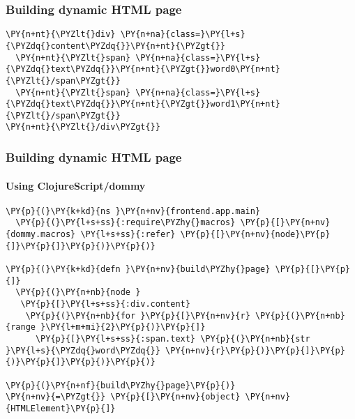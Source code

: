 \begin{frame}[fragile]
  \frametitle{Building dynamic HTML page}
\begin{Verbatim}[commandchars=\\\{\}]
\PY{n+nt}{\PYZlt{}div} \PY{n+na}{class=}\PY{l+s}{\PYZdq{}content\PYZdq{}}\PY{n+nt}{\PYZgt{}}
  \PY{n+nt}{\PYZlt{}span} \PY{n+na}{class=}\PY{l+s}{\PYZdq{}text\PYZdq{}}\PY{n+nt}{\PYZgt{}}word0\PY{n+nt}{\PYZlt{}/span\PYZgt{}}
  \PY{n+nt}{\PYZlt{}span} \PY{n+na}{class=}\PY{l+s}{\PYZdq{}text\PYZdq{}}\PY{n+nt}{\PYZgt{}}word1\PY{n+nt}{\PYZlt{}/span\PYZgt{}}
\PY{n+nt}{\PYZlt{}/div\PYZgt{}}
\end{Verbatim}
\end{frame}


\begin{frame}[fragile]
  \frametitle{Building dynamic HTML page}
  \framesubtitle{Using ClojureScript/dommy}
\begin{Verbatim}[commandchars=\\\{\}]
\PY{p}{(}\PY{k+kd}{ns }\PY{n+nv}{frontend.app.main}
  \PY{p}{(}\PY{l+s+ss}{:require\PYZhy{}macros} \PY{p}{[}\PY{n+nv}{dommy.macros} \PY{l+s+ss}{:refer} \PY{p}{[}\PY{n+nv}{node}\PY{p}{]}\PY{p}{]}\PY{p}{)}\PY{p}{)}

\PY{p}{(}\PY{k+kd}{defn }\PY{n+nv}{build\PYZhy{}page} \PY{p}{[}\PY{p}{]}
  \PY{p}{(}\PY{n+nb}{node }
   \PY{p}{[}\PY{l+s+ss}{:div.content}
    \PY{p}{(}\PY{n+nb}{for }\PY{p}{[}\PY{n+nv}{r} \PY{p}{(}\PY{n+nb}{range }\PY{l+m+mi}{2}\PY{p}{)}\PY{p}{]}
      \PY{p}{[}\PY{l+s+ss}{:span.text} \PY{p}{(}\PY{n+nb}{str }\PY{l+s}{\PYZdq{}word\PYZdq{}} \PY{n+nv}{r}\PY{p}{)}\PY{p}{]}\PY{p}{)}\PY{p}{]}\PY{p}{)}\PY{p}{)}

\PY{p}{(}\PY{n+nf}{build\PYZhy{}page}\PY{p}{)}
\PY{n+nv}{=\PYZgt{}} \PY{p}{[}\PY{n+nv}{object} \PY{n+nv}{HTMLElement}\PY{p}{]}
\end{Verbatim}
\end{frame}


